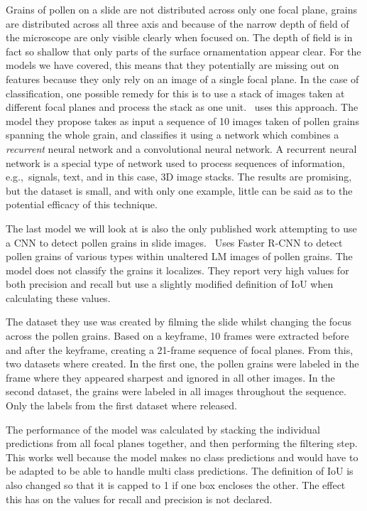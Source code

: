 Grains of pollen on a slide are not distributed across only one focal plane, grains are distributed across all three axis and because of the narrow depth of field of the microscope are only visible clearly when focused on.
The depth of field is in fact so shallow that only parts of the surface ornamentation appear clear.
For the models we have covered, this means that they potentially are missing out on features because they only rely on an image of a single focal plane.
In the case of classification, one possible remedy for this is to use a stack of images taken at different focal planes and process the stack as one unit.\ \cite{DaoodAndRibeiro_2018} uses this approach.
The model they propose takes as input a sequence of 10 images taken of pollen grains spanning the whole grain, and classifies it using a network which combines a \textit{recurrent} neural network and a convolutional neural network.
A recurrent neural network is a special type of network used to process sequences of information, e.g.,\ signals, text, and in this case, 3D image stacks.
The results are promising, but the dataset is small, and with only one example, little can be said as to the potential efficacy of this technique.

The last model we will look at is also the only published work attempting to use a CNN to detect pollen grains in slide images.\ \cite{gallardo_caballero_precise_2019} Uses Faster R-CNN to detect pollen grains of various types within unaltered LM images of pollen grains.
The model does not classify the grains it localizes.
They report very high values for both precision and recall but use a slightly modified definition of IoU when calculating these values.

The dataset they use was created by filming the slide whilst changing the focus across the pollen grains.
Based on a keyframe, 10 frames were extracted before and after the keyframe, creating a 21-frame sequence of focal planes.
From this, two datasets where created.
In the first one, the pollen grains were labeled in the frame where they appeared sharpest and ignored in all other images.
In the second dataset, the grains were labeled in all images throughout the sequence.
Only the labels from the first dataset where released.

The performance of the model was calculated by stacking the individual predictions from all focal planes together, and then performing the filtering step.
This works well because the model makes no class predictions and would have to be adapted to be able to handle multi class predictions.
The definition of IoU is also changed so that it is capped to 1 if one box encloses the other.
The effect this has on the values for recall and precision is not declared.

